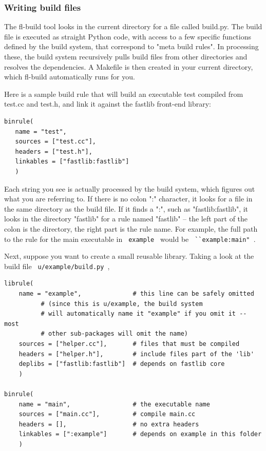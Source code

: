 \documentclass[letter]{report}
\begin{document}
\subsubsection{Writing build files}

The fl-build tool looks in the current directory for a file called build.py. The build file is executed as straight Python code, with access to a few specific functions defined by the build system, that correspond to "meta build rules". In processing these, the build system recursively pulls build files from other directories and resolves the dependencies. A Makefile is then created in your current directory, which fl-build automatically runs for you.

Here is a sample build rule that will build an executable test compiled from test.cc and test.h, and link it against the fastlib front-end library:
\begin{verbatim}
binrule(
   name = "test",
   sources = ["test.cc"],
   headers = ["test.h"],
   linkables = ["fastlib:fastlib"]
   )
\end{verbatim}
Each string you see is actually processed by the build system, which figures out what you are referring to. If there is no colon ":" character, it looks for a file in the same directory as the build file. If it finds a ":", such as "fastlib:fastlib", it looks in the directory "fastlib" for a rule named "fastlib" -- the left part of the colon is the directory, the right part is the rule name. For example, the full path to the rule for the main executable in \verb= example = would be \verb= ``example:main" =.

Next, suppose you want to create a small reusable library. Taking a look at the build file \verb= u/example/build.py =,
\begin{verbatim}
librule(
    name = "example",              # this line can be safely omitted
          # (since this is u/example, the build system
          # will automatically name it "example" if you omit it -- most
          # other sub-packages will omit the name)
    sources = ["helper.cc"],       # files that must be compiled
    headers = ["helper.h"],        # include files part of the 'lib'
    deplibs = ["fastlib:fastlib"]  # depends on fastlib core
    )

binrule(
    name = "main",                 # the executable name
    sources = ["main.cc"],         # compile main.cc
    headers = [],                  # no extra headers
    linkables = [":example"]       # depends on example in this folder
    )
\end{verbatim}
\end{document}
